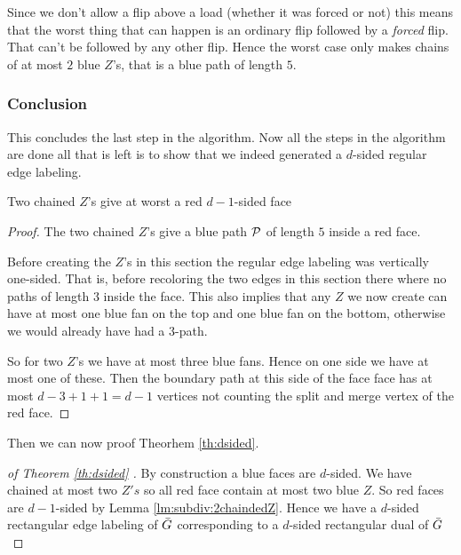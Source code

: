   Since we don't allow a flip above a load (whether it was forced or not) this means that the worst thing that can happen is an ordinary flip followed by a \emph{forced} flip. That can't be followed by any other flip. Hence the worst case only makes chains of at most $2$ blue $Z$'s, that is a blue path of length $5$.


\subsubsection{Conclusion}
  This concludes the last step in the algorithm.
  Now all the steps in the algorithm are done all that is left is to show that we indeed generated a $d$-sided regular edge labeling.
  \begin{lemma}
    \label{lm:subdiv:2chaindedZ}
    Two chained $Z$'s give at worst a red $d-1$-sided face
  \end{lemma}
  \begin{proof}
    The two chained $Z$'s give a blue path $\P$ of length $5$ inside a red face.

    Before creating the $Z$'s in this section the regular edge labeling was vertically one-sided. That is, before recoloring the two edges in this section there where no paths of length $3$ inside the face. This also implies that any $Z$ we now create can have at most one blue fan on the top and one blue fan on the bottom, otherwise we would already have had a $3$-path.

    So for two $Z$'s we have at most three blue fans. Hence on one side we have at most one of these. Then the boundary path at this side of the face face has at most $d-3 + 1 +1 =d-1$ vertices not counting the split and merge vertex of the red face.
  \end{proof}

    Then we can now proof Theorhem \ref{th:dsided}.

  \begin{proof}[of Theorem \ref{th:dsided} ]
    By construction a blue faces are $d$-sided. We have chained at most two $Z's$ so all red face contain at most two blue $Z$. So red faces are $d-1$-sided by Lemma \ref{lm:subdiv:2chaindedZ}. Hence we have a $d$-sided rectangular edge labeling of $\ext G$ corresponding to a $d$-sided rectangular dual of $\ext G$
  \end{proof}
